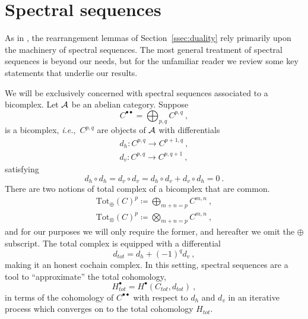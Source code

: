\documentclass[a4paper]{article}
\def\AA{{\cal A}}
\def \ie{{\it i.e.}}
\begin{document}
\section{\label{app:spectral_sequences}Spectral sequences}

As in \cite{Arakawa:2018egx}, the rearrangement lemmas of Section~\ref{ssec:duality} rely primarily upon the machinery of spectral sequences. The most general treatment of spectral sequences is beyond our needs, but for the unfamiliar reader we review some key statements that underlie our results.

We will be exclusively concerned with spectral sequences associated to a bicomplex. Let $\AA$ be an abelian category. Suppose
\begin{equation}
	C^{\bullet\bullet} = \bigoplus_{p,q}C^{p,q}~,
\end{equation}
is a bicomplex, \ie,~$C^{p,q}$ are objects of $\AA$ with differentials
\begin{equation}
	\begin{split}
	d_h: C^{p,q}\rightarrow C^{p+1,q}~,\\
	d_v: C^{p,q}\rightarrow C^{p,q+1}~,
	\end{split}
\end{equation}
satisfying
\begin{equation}
	d_h\circ d_h =d_v\circ d_v = d_h\circ d_v + d_v\circ d_h =0~.
\end{equation}
There are two notions of total complex of a bicomplex that are common.
\begin{equation}
	\begin{split}
	\mathrm{Tot}_\oplus(C)^p \coloneqq \bigoplus_{m+n=p}C^{m,n}~,\\
	\mathrm{Tot}_\otimes(C)^p \coloneqq \bigotimes_{m+n=p}C^{m,n}~,
	\end{split}
\end{equation}
and for our purposes we will only require the former, and hereafter we omit the $\oplus$ subscript. The total complex is equipped with a differential
\begin{equation}
	d_{tot} = d_h +(-1)^qd_v~,
\end{equation}
making it an honest cochain complex. In this setting, spectral sequences are a tool to ``approximate'' the total cohomology,
\begin{equation}
	H_{tot}^\bullet = H^\bullet(C_{tot},d_{tot})~,
\end{equation}
in terms of the cohomology of $C^{\bullet\bullet}$ with respect to $d_h$ and $d_v$ in an iterative process which converges on to the total cohomology $H_{tot}$.
\end{document}
